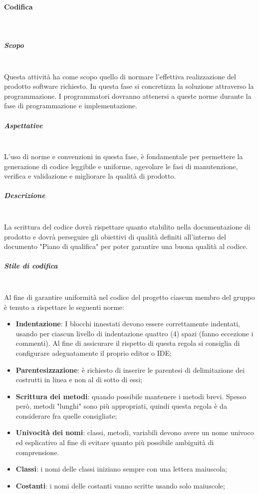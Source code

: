 \begin{itemize}
\paragraph{Codifica} \mbox{}\\
\subparagraph{Scopo} \mbox{}\\
Questa attività ha come scopo quello di normare l'effettiva realizzazione del prodotto software richiesto. In questa fase si concretizza la soluzione attraverso la programmazione. I programmatori dovranno attenersi a queste norme durante la fase di programmazione e implementazione.
\subparagraph{Aspettative} \mbox{}\\
L'uso di norme e convenzioni in questa fase, è fondamentale per permettere la generazione di codice leggibile e uniforme,  agevolare le fasi di manutenzione,  verifica e validazione e migliorare la qualità di prodotto.
\subparagraph{Descrizione} \mbox{}\\
La scrittura del codice dovrà rispettare quanto stabilito nella documentazione di prodotto e dovrà perseguire gli obiettivi di qualità definiti all’interno del documento "Piano di qualifica" per poter garantire una buona qualità al codice.
\subparagraph{Stile di codifica} \mbox{}\\
Al fine di garantire uniformità nel codice del progetto ciascun membro del gruppo è
tenuto a rispettare le seguenti norme:
\begin{itemize}
	\item \textbf{Indentazione}: I blocchi innestati devono essere correttamente indentati, usando per ciascun livello di indentazione quattro (4) spazi (fanno eccezione i commenti). Al fine di assicurare il rispetto di questa regola si consiglia di configurare adeguatamente il proprio editor o IDE; %
	\item \textbf{Parentesizzazione}: è richiesto di inserire le parentesi di delimitazione dei costrutti in linea e non al di sotto di essi;
	\item \textbf{Scrittura dei metodi}: quando possibile mantenere i metodi brevi. Spesso però, metodi "lunghi" sono più appropriati, quindi questa regola è da considerare fra quelle consigliate;
	\item \textbf{Univocità dei nomi}: classi, metodi, variabili devono avere un nome univoco	ed esplicativo al fine di evitare quanto più possibile ambiguità di comprensione.
	\item \textbf{Classi}: i nomi delle classi iniziano sempre con una lettera maiuscola;
	\item \textbf{Costanti}: i nomi delle costanti vanno scritte usando solo maiuscole;

\end{itemize}
\end{itemize}

